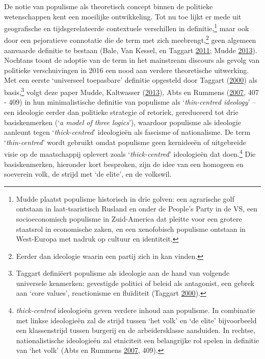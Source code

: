 \documentclass[10.5pt,dutch,]{article}
\begin{document}
De notie van populisme als theoretisch concept binnen de politieke
wetenschappen kent een moeilijke ontwikkeling. Tot nu toe lijkt er mede
uit geografische en tijdsgerelateerde contextuele verschillen in
definitie,\footnote{Mudde plaatst populisme historisch in drie golven:
  een agrarische golf ontstaan in laat-tsaristisch Rusland en onder de
  People's Party in de VS, een socioeconomisch populisme in Zuid-America
  dat pleitte voor een grotere staatsrol in economische zaken, en een
  xenofobisch populisme ontstaan in West-Europa met nadruk op cultuur en
  identiteit.} maar ook door een pejoratieve connotatie die de term met
zich meebrengt,\footnote{Eerder dan ideologie waarin een partij zich in
  kan vinden.} geen algemeen aanvaarde definitie te bestaan (Bale, Van
Kessel, en Taggart \protect\hyperlink{ref-baleux5fthrownux5f2011}{2011};
Mudde \protect\hyperlink{ref-muddeux5foxfordux5f2013}{2013}). Nochtans
toont de adoptie van de term in het mainstream discours als gevolg van
politieke verschuivingen in 2016 een nood aan verdere theoretische
uitwerking. Met een eerste `universeel toepasbare' definitie opgesteld
door Taggart (\protect\hyperlink{ref-taggartux5fpopulismux5f2000}{2000})
als basis,\footnote{Taggart definiëert populisme als ideologie aan de
  hand van volgende universele kenmerken: gevestigde politici of beleid
  als antagonist, een gebrek aan `core values', reactionisme en
  fluïditeit (Taggart
  \protect\hyperlink{ref-taggartux5fpopulismux5f2000}{2000}).} volgt
deze paper Mudde, Kaltwasser
(\protect\hyperlink{ref-muddeux5foxfordux5f2013}{2013}), Abts en Rummens
(\protect\hyperlink{ref-abtsux5fpopulismux5f2007}{2007}, 407 - 409) in
hun minimalistische definitie van populisme als `\emph{thin-centred
ideology}' -- een ideologie eerder dan politieke strategie of retoriek,
gereduceerd tot drie basiskenmerken (`\emph{a model of three logics}'),
waardoor populisme als ideologie aanleunt tegen `\emph{thick-centred}'
ideologieën als fascisme of nationalisme. De term `\emph{thin-centred}'
wordt gebruikt omdat populisme geen kernideeën of uitgebreide visie op
de maatschappij oplevert zoals `\emph{thick-centred}' ideologieën dat
doen.\footnote{\emph{thick-centred} ideologieën geven verdere inhoud aan
  populisme. In combinatie met linkse ideologieën zal de strijd tussen
  `het volk' en `de elite' bijvoorbeeld een klassenstrijd tussen
  burgerij en de arbeidersklasse aanduiden. In rechtse, nationalistische
  ideologieën zal etniciteit een belangrijke rol spelen in definitie van
  `het volk' (Abts en Rummens
  \protect\hyperlink{ref-abtsux5fpopulismux5f2007}{2007}, 409).} Die
basiskenmerken, hieronder kort besproken, zijn de idee van een homogeen
en soeverein volk, de strijd met `de elite', en de volkswil.
\end{document}

